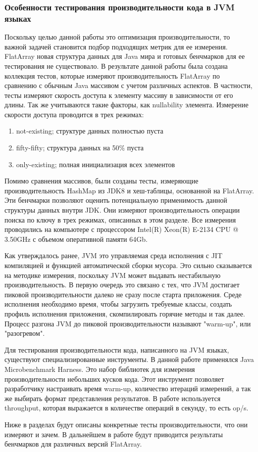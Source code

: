 \subsubsection{Особенности тестирования производительности кода в JVM языках}
Поскольку целью данной работы это оптимизация производительности, то важной задачей становится подбор подходящих метрик для ее измерения. FlatArray новая структура данных для Java мира и готовых бенчмарков для ее тестирования не существовало. 
В результате данной работы была создана коллекция тестов, которые измеряют производительность FlatArray по сравнению с обычным Java массивом с учетом различных аспектов.
В частности, тесты измеряют скорость доступа к элементу массиву в зависимости от его длины. Так же учитываются такие факторы, как nullability элемента. Измерение скорости доступа проводится в трех режимах:
\begin{enumerate}
	\item not-existing; структуре данных полностью пуста
	\item fifty-fifty; структура данных на 50\% пуста
	\item only-existing; полная инициализация всех элементов
\end{enumerate}
Помимо сравнения массивов, были созданы тесты, измеряющие производительность HashMap из JDK8 и хеш-таблицы, основанной на FlatArray. Эти бенчмарки позволяют оценить потенциальную применимость данной структуры данных внутри JDK. Они измеряют производительность операции поиска по ключу в трех режимах, описанных в этом разделе.
Все измерения проводились на компьютере с процессором Intel(R) Xeon(R) E-2134 CPU @ 3.50GHz
с объемом оперативной памяти 64Gb.
\par
Как утверждалось ранее, JVM это управляемая среда исполнения с JIT компиляцией и функцией автоматической сборки мусора. Это сильно сказывается на методике измерения, поскольку JVM может выдавать нестабильную производительность. 
В первую очередь это связано с тех, что JVM достигает пиковой производительности далеко не сразу после старта приложения.
Среде исполнения необходимо время, чтобы загрузить требуемые классы, создать профиль исполнения приложения, скомпилировать горячие методы и так далее.
Процесс разгона JVM до пиковой производительности называют "warm-up", или "разогревом".
\par
Для тестирования производительности кода, написанного на JVM языках, существуют специализированные инструменты. 
В данной работе применялся Java Microbenchmark Harness\cite{jmh}. Это набор библиотек для измерения производительности небольших кусков кода.
Этот инструмент позволяет разработчику настраивать время warm-up, количество итераций измерений, а так же выбирать формат представления результатов. 
В работе используется throughput, которая выражается в количестве операций в секунду, то есть op/s. 
\par
Ниже в разделах будут описаны конкретные тесты производительности, что они измеряют и зачем. В дальнейшем в работе будут приводится результаты бенчмарков для различных версий FlatArray.

